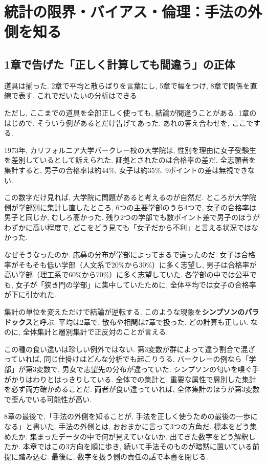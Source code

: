 ﻿\section{統計の限界・バイアス・倫理：手法の外側を知る}

\subsection{1章で告げた「正しく計算しても間違う」の正体}

道具は揃った.
2章で平均と散らばりを言葉にし, 5章で幅をつけ, 8章で関係を直線で表す. これでだいたいの分析はできる.

ただし, ここまでの道具を全部正しく使っても, 結論が間違うことがある.
1章のはじめで, そういう例があるとだけ告げてあった.
あれの答え合わせを, ここでする.

1973年, カリフォルニア大学バークレー校の大学院は, 性別を理由に女子受験生を差別しているとして訴えられた.
証拠とされたのは合格率の差だ.
全志願者を集計すると, 男子の合格率は約44\%, 女子は約35\%.
9ポイントの差は無視できない.

この数字だけ見れば, 大学院に問題があると考えるのが自然だ.
ところが大学院側が学部別に集計し直したところ, 6つの主要学部のうち4つで, 女子の合格率は男子と同じか, むしろ高かった.
残り2つの学部でも数ポイント差で男子のほうがわずかに高い程度で, どこをどう見ても「女子だから不利」と言える状況ではなかった.

なぜそうなったのか. 応募の分布が学部によってまるで違ったのだ.
女子は合格率がそもそも低い学部（人文系で20\%から30\%）に多く志望し, 男子は合格率が高い学部（理工系で60\%から70\%）に多く志望していた.
各学部の中では公平でも, 女子が「狭き門の学部」に集中していたために, 全体平均では女子の合格率が下に引かれた.

集計の単位を変えただけで結論が逆転する.
このような現象を\textbf{シンプソンのパラドックス}と呼ぶ.
平均は2章で, 散布や相関は7章で扱った. どの計算も正しい.
なのに, 全体集計と層別集計で正反対のことが言える.

この種の食い違いは珍しい例外ではない.
第3変数が群によって違う割合で混ざっていれば, 同じ仕掛けはどんな分析でも起こりうる.
バークレーの例なら「学部」が第3変数で, 男女で志望先の分布が違っていた.
シンプソンの匂いを嗅ぐ手がかりはわりとはっきりしている. 全体での集計と, 重要な属性で層別した集計を必ず両方確かめることだ.
両者が食い違っていれば, 全体集計のほうが第3変数で歪んでいる可能性が高い.

8章の最後で,「手法の外側を知ることが, 手法を正しく使うための最後の一歩になる」と書いた.
手法の外側とは, おおまかに言って3つの方角だ.
標本をどう集めたか. 集まったデータの中で何が見えていないか. 出てきた数字をどう解釈したか.
本章ではこの3方向を順に歩き, 続いて手法そのものが暗黙に置いている前提に踏み込む.
最後に, 数字を扱う側の責任の話で本書を閉じる.

